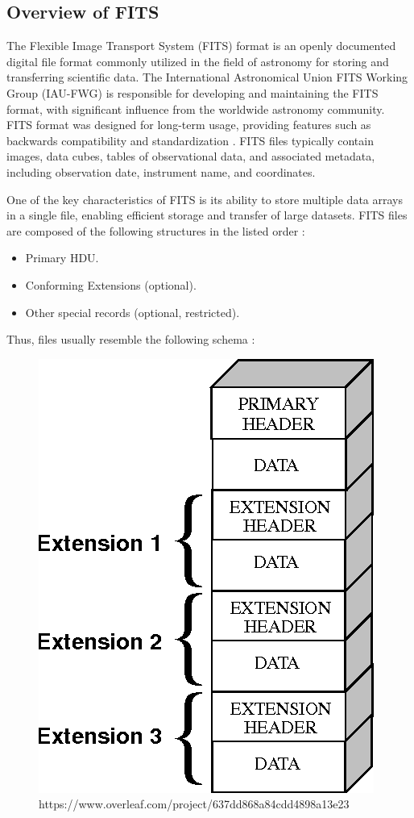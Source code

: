 \documentclass[licencjacka,en]{pracamgr}
\begin{document}
\subsection{Overview of FITS}

The Flexible Image Transport System (FITS) format is an openly documented digital file format commonly utilized in the field of astronomy for storing and transferring scientific data. The International Astronomical Union FITS Working Group (IAU-FWG) \cite{fits-working-group}is responsible for developing and maintaining the FITS format, with significant influence from the worldwide astronomy community. FITS format was designed for long-term usage, providing features such as backwards compatibility and standardization \cite{fits-standard}. FITS files typically contain images, data cubes, tables of observational data, and associated metadata, including observation date, instrument name, and coordinates.

One of the key characteristics of FITS is its ability to store multiple data arrays in a single file, enabling efficient storage and transfer of large datasets. FITS files are composed of the following structures in the listed order \cite{fits-official}:
\begin{itemize}
\item Primary HDU.
\item Conforming Extensions (optional).
\item Other special records (optional, restricted).
\end{itemize}

Thus, files usually resemble the following schema \cite{fits-image}:

\begin{figure}[h]
\centering
\includegraphics[scale=0.3]{fits}https://www.overleaf.com/project/637dd868a84cdd4898a13e23
\end{figure}
\end{document}

